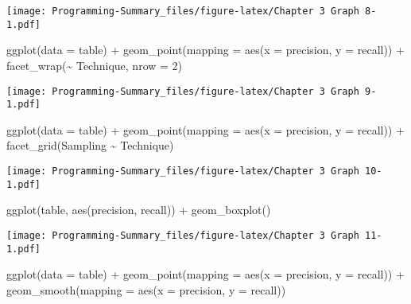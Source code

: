 \documentclass[
]{article}
\newenvironment{Shaded}{\begin{snugshade}}{\end{snugshade}}
\newcommand{\AttributeTok}[1]{\textcolor[rgb]{0.77,0.63,0.00}{#1}}
\newcommand{\DecValTok}[1]{\textcolor[rgb]{0.00,0.00,0.81}{#1}}
\newcommand{\FunctionTok}[1]{\textcolor[rgb]{0.00,0.00,0.00}{#1}}
\newcommand{\NormalTok}[1]{#1}
\newcommand{\SpecialCharTok}[1]{\textcolor[rgb]{0.00,0.00,0.00}{#1}}
\begin{document}
\texttt{[image: Programming-Summary\_files/figure-latex/Chapter 3 Graph 8-1.pdf]}

\begin{Shaded}
\begin{Highlighting}[]
\FunctionTok{ggplot}\NormalTok{(}\AttributeTok{data =}\NormalTok{ table) }\SpecialCharTok{+} 
  \FunctionTok{geom\_point}\NormalTok{(}\AttributeTok{mapping =} \FunctionTok{aes}\NormalTok{(}\AttributeTok{x =}\NormalTok{ precision, }\AttributeTok{y =}\NormalTok{ recall)) }\SpecialCharTok{+} \FunctionTok{facet\_wrap}\NormalTok{(}\SpecialCharTok{\textasciitilde{}}\NormalTok{ Technique, }\AttributeTok{nrow =} \DecValTok{2}\NormalTok{)}
\end{Highlighting}
\end{Shaded}

\texttt{[image: Programming-Summary\_files/figure-latex/Chapter 3 Graph 9-1.pdf]}

\begin{Shaded}
\begin{Highlighting}[]
\FunctionTok{ggplot}\NormalTok{(}\AttributeTok{data =}\NormalTok{ table) }\SpecialCharTok{+} 
  \FunctionTok{geom\_point}\NormalTok{(}\AttributeTok{mapping =} \FunctionTok{aes}\NormalTok{(}\AttributeTok{x =}\NormalTok{ precision, }\AttributeTok{y =}\NormalTok{ recall)) }\SpecialCharTok{+} 
  \FunctionTok{facet\_grid}\NormalTok{(Sampling }\SpecialCharTok{\textasciitilde{}}\NormalTok{ Technique)}
\end{Highlighting}
\end{Shaded}

\texttt{[image: Programming-Summary\_files/figure-latex/Chapter 3 Graph 10-1.pdf]}

\begin{Shaded}
\begin{Highlighting}[]
\FunctionTok{ggplot}\NormalTok{(table, }\FunctionTok{aes}\NormalTok{(precision, recall)) }\SpecialCharTok{+} \FunctionTok{geom\_boxplot}\NormalTok{()}
\end{Highlighting}
\end{Shaded}

\texttt{[image: Programming-Summary\_files/figure-latex/Chapter 3 Graph 11-1.pdf]}

\begin{Shaded}
\begin{Highlighting}[]
\FunctionTok{ggplot}\NormalTok{(}\AttributeTok{data =}\NormalTok{ table) }\SpecialCharTok{+} 
  \FunctionTok{geom\_point}\NormalTok{(}\AttributeTok{mapping =} \FunctionTok{aes}\NormalTok{(}\AttributeTok{x =}\NormalTok{ precision, }\AttributeTok{y =}\NormalTok{ recall)) }\SpecialCharTok{+}
  \FunctionTok{geom\_smooth}\NormalTok{(}\AttributeTok{mapping =} \FunctionTok{aes}\NormalTok{(}\AttributeTok{x =}\NormalTok{ precision, }\AttributeTok{y =}\NormalTok{ recall))}
\end{Highlighting}
\end{Shaded}
\end{document}
